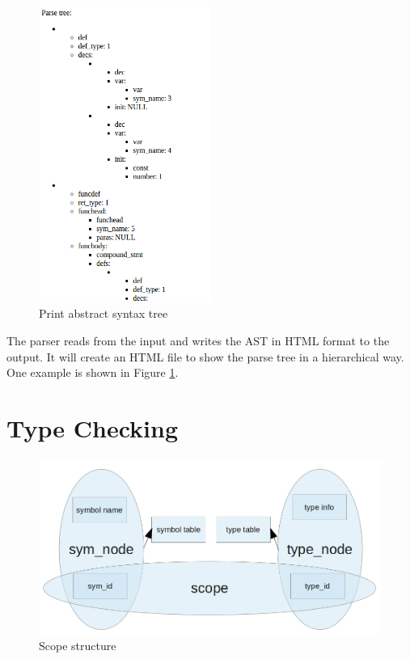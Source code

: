 \documentclass[a4paper]{article}
\begin{document}
\begin{figure}
  \centering
  \includegraphics[width=0.5\textwidth]{printast}
  \caption{Print abstract syntax tree}
  \label{fig:printast}
\end{figure}


The parser reads from the input and writes the AST in HTML format to the output. 
It will create an HTML file to show the parse tree in a hierarchical way. One example is shown in Figure \ref{fig:printast}.


\section{Type Checking}

\begin{figure}
  \centering
  \includegraphics[width=\textwidth]{scope}
  \caption{Scope structure}
  \label{fig:scope}
\end{figure}
\end{document}
